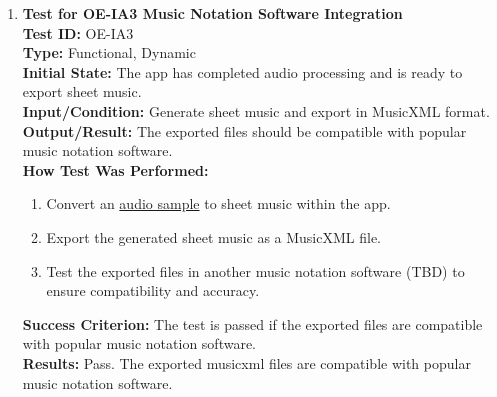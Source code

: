 \documentclass[12pt, titlepage]{article}
\begin{document}
\begin{enumerate}
    \item \textbf{Test for OE-IA3 Music Notation Software Integration} \\
      \newline
      \textbf{Test ID:} OE-IA3 \\
      \textbf{Type:} Functional, Dynamic \\
      \textbf{Initial State:} The app has completed audio processing and is ready to export sheet music. \\
      \textbf{Input/Condition:} Generate sheet music and export in MusicXML format. \\
      \textbf{Output/Result:} The exported files should be compatible with popular music notation software. \\
      \textbf{How Test Was Performed:}
      \begin{enumerate}
          \item Convert an \href{https://github.com/emilyperica/ScoreGen/tree/main/test/TestingDatasets/piano-samples/sample-songs}{audio sample} to sheet music within the app.
          \item Export the generated sheet music as a MusicXML file.
          \item Test the exported files in another music notation software (TBD) to ensure compatibility and accuracy.
      \end{enumerate}
      \textbf{Success Criterion:} The test is passed if the exported files are compatible with popular music notation software.\\
      \textbf{Results:} Pass. The exported musicxml files are compatible with popular music notation software.\\


\end{enumerate}
\end{document}
